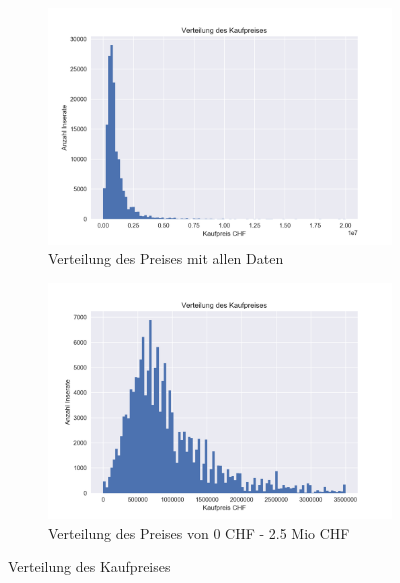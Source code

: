 \begin{figure}[ht]
\begin{subfigure}{.5\textwidth}
  \centering
  \includegraphics[width=\linewidth]{images/bar_des_kauf_preises.png}
  \caption[Verteilung des Preises mit allen Daten]{Verteilung des Preises mit allen Daten\\}
  \label{fig:verteilung_price_all}
\end{subfigure}
\begin{subfigure}{.5\textwidth}
  \centering
  \includegraphics[width=\linewidth]{images/bar_des_kauf_preises_cut.png}
  \caption[Verteilung des Preises von 0 CHF - 2.5 Mio CHF]{Verteilung des Preises von 0 CHF - 2.5 Mio CHF}
  \label{fig:verteilung_price_part}
\end{subfigure}
\caption[Verteilung des Kaufpreises]{Verteilung des Kaufpreises}
\label{fig:price}
\end{figure}

